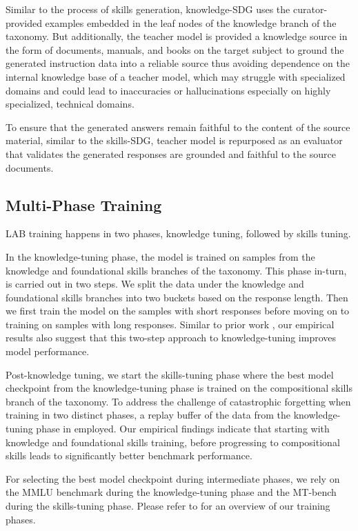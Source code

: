 Similar to the process of skills generation, knowledge-SDG uses the curator-provided examples embedded in the leaf nodes of the knowledge branch of the taxonomy. But additionally, the teacher model is provided a knowledge source in the form of documents, manuals, and books on the target subject to ground the generated instruction data into a reliable source thus avoiding dependence on the internal knowledge base of a teacher model, which may struggle with specialized domains and could lead to inaccuracies or hallucinations especially on highly specialized, technical domains. 

To ensure that the generated answers remain faithful to the content of the source material, similar to the skills-SDG, teacher model is repurposed as an evaluator that validates the generated responses are grounded and faithful to the source documents.

\subsection{Multi-Phase Training}\label{sec:train}

LAB training happens in two phases, knowledge tuning, followed by skills tuning. 

In the knowledge-tuning phase, the model is trained on samples from the knowledge and foundational skills branches of the taxonomy. This phase in-turn, is carried out in two steps. We split the data under the knowledge and foundational skills branches into two buckets based on the response length. Then we first train the model on the samples with short responses before moving on to training on samples with long responses. Similar to prior work \citep{mitra2023orcateaching}, our empirical results also suggest that this two-step approach to knowledge-tuning improves model performance.

Post-knowledge tuning, we start the skills-tuning phase where the best model checkpoint from the knowledge-tuning phase is trained on the compositional skills branch of the taxonomy. To address the challenge of catastrophic forgetting when training in two distinct phases, a replay buffer of the data from the knowledge-tuning phase in employed. Our empirical findings indicate that starting with knowledge and foundational skills training, before progressing to compositional skills leads to significantly better benchmark performance. 

For selecting the best model checkpoint during intermediate phases, we rely on the MMLU benchmark \citep{hendrycks2020measuring} during the knowledge-tuning phase and the MT-bench \citep{zheng2024judging} during the skills-tuning phase. Please refer to  for an overview of our training phases.

